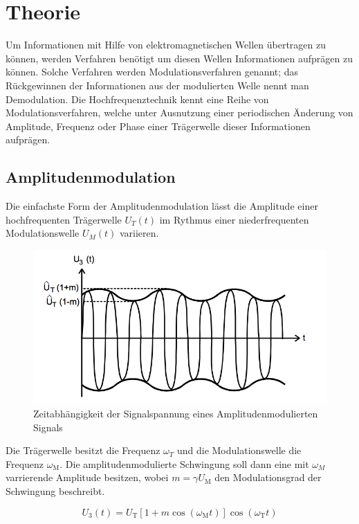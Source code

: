 \section{Theorie}
Um Informationen mit Hilfe von elektromagnetischen Wellen übertragen zu können, werden Verfahren benötigt um diesen Wellen Informationen aufprägen zu können. Solche Verfahren werden Modulationsverfahren genannt; das Rückgewinnen der Informationen aus der modulierten Welle nennt man Demodulation.
Die Hochfrequenztechnik kennt eine Reihe von Modulationsverfahren, welche unter Ausnutzung einer periodischen Änderung von Amplitude, Frequenz oder Phase einer Trägerwelle dieser Informationen aufprägen.

\subsection{Amplitudenmodulation}
Die einfachste Form der Amplitudenmodulation lässt die Amplitude einer hochfrequenten Trägerwelle $U_T(t)$ im Rythmus einer niederfrequenten Modulationswelle $U_M(t)$ variieren. 

\begin{figure}[h]
	\centering
	\includegraphics[width=\textwidth]{img/Abb1.png}
	\caption{Zeitabhängigkeit der Signalspannung eines Amplitudenmodulierten Signals \cite{FP}}
\end{figure}

\noindent Die Trägerwelle besitzt die Frequenz $\omega_T$ und die Modulationswelle die \\
Frequenz $\omega_\text{M}$. Die amplitudenmodulierte Schwingung soll dann eine mit $\omega_M$ varrierende Amplitude
besitzen, wobei $m = \gamma U_\text{M}$ den  Modulationsgrad der Schwingung beschreibt.

\begin{equation}
U_{3}(t) = U_\text{T} \left[1 + m \cos( \omega_\text{M} t)\right]\cos(\omega_\text{T} t)
\label{eq:AmMod}
\end{equation} 

